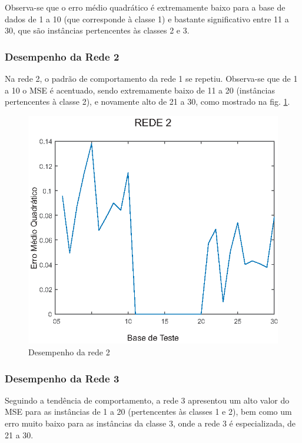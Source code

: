 Observa-se que o erro médio quadrático é extremamente baixo para a base de dados de 1 a 10 (que corresponde à classe 1) e bastante significativo entre 11 a 30, que são instâncias pertencentes às classes 2 e 3.

\subsubsection{Desempenho da Rede 2}

Na rede 2, o padrão de comportamento da rede 1 se repetiu. Observa-se que de 1 a 10 o MSE é acentuado, sendo extremamente baixo de 11 a 20 (instâncias pertencentes à classe 2), e novamente alto de 21 a 30, como mostrado na fig. \ref{figura:rede2}.

\begin{figure}[H]

\centering %
\includegraphics{04-Figuras/MSE_DesempenhoNet2}

\caption{Desempenho da rede 2}

\label{figura:rede2}

\end{figure}

\subsubsection{Desempenho da Rede 3}

Seguindo a tendência de comportamento, a rede 3 apresentou um alto valor do MSE para as instâncias de 1 a 20 (pertencentes às classes 1 e 2), bem como um erro muito baixo para as instâncias da classe 3, onde a rede 3 é especializada, de 21 a 30.

